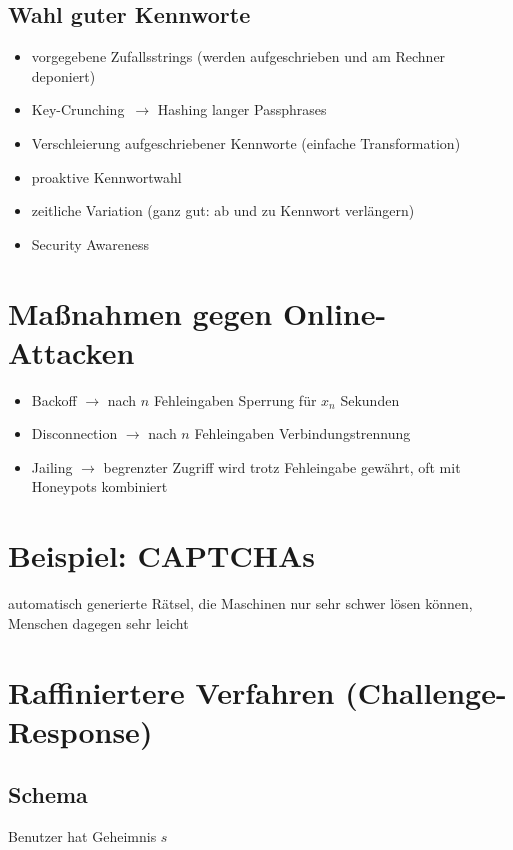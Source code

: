 \documentclass[a4paper,twoside,DIV15,BCOR12mm]{scrbook}
\begin{document}
\subsection{Wahl guter Kennworte}

\begin{itemize}
	\item vorgegebene Zufallsstrings (werden aufgeschrieben und am Rechner deponiert)
	\item \glqq Key-Crunching\grqq\ $\rightarrow$ Hashing langer Passphrases
	\item Verschleierung aufgeschriebener Kennworte (einfache Transformation)
	\item proaktive Kennwortwahl
	\item zeitliche Variation (ganz gut: ab und zu Kennwort verlängern)
	\item Security Awareness
\end{itemize}

\section{Maßnahmen gegen Online-Attacken}

\begin{itemize}
	\item Backoff $\rightarrow$ nach $n$ Fehleingaben Sperrung für $x_n$ Sekunden
	\item Disconnection $\rightarrow$ nach $n$ Fehleingaben Verbindungstrennung
	\item Jailing $\rightarrow$ begrenzter Zugriff wird trotz Fehleingabe gewährt, oft mit Honeypots kombiniert
\end{itemize}

\section{Beispiel: CAPTCHAs}

automatisch generierte Rätsel, die Maschinen nur sehr schwer lösen können, Menschen dagegen sehr leicht

\section{Raffiniertere Verfahren (Challenge-Response)}

\subsection{Schema} Benutzer hat Geheimnis $s$\\
\end{document}
